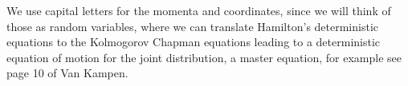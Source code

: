 We use capital letters for the momenta and coordinates, since we will think of those as random variables, where we can translate Hamilton's deterministic equations to the Kolmogorov Chapman equations leading to a deterministic equation of motion for the joint distribution, a master equation, for example see page 10 of Van Kampen\cite{vankampen}. 